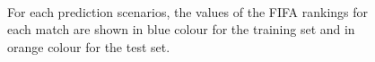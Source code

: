 \documentclass{statsoc}
\begin{document}
\begin{center}
\begin{figure}
~
\\
\centering
{}
\caption{For each prediction scenarios, the values of the FIFA rankings for each match are shown in blue colour for the training set and in orange colour for the test set.}
\label{Fig1}
\end{figure}
\end{center}
\end{document}
